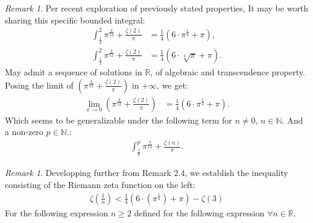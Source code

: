 \documentclass[10pt]{article}
\theoremstyle{plain}
\theoremstyle{definition}
\theoremstyle{remark}
\newtheorem{remark}[theorem]{Remark}
\begin{document}
\begin{remark}
	Per recent exploration of previously stated properties, It may be worth sharing this specific bounded integral:
	\begin{align*}
		\int_{\frac{1}{2}}^{2} \pi^{\frac{3}{12}} + \frac{\zeta(2)}{\pi} &= \frac{1}{4} (6 \cdot \pi^{\frac{1}{4}} + \pi),\\
		\int_{\frac{1}{2}}^{2} \pi^{\frac{3}{12}} + \frac{\zeta(2)}{\pi} &= \frac{1}{4} (6 \cdot \sqrt[4]{\pi} + \pi).
	\end{align*}
	May admit a sequence of solutions in $\mathbb{R}$, of algebraic and transcendence property. Posing the limit of $(\pi^{\frac{3}{12}} + \frac{\zeta(2)}{\pi})$ in $+\infty$, we get:
	\begin{align*}
	\lim_{x \to 0} (\pi^{\frac{3}{12}} + \frac{\zeta(2)}{\pi}) &= \frac{1}{4} (6 \cdot \pi^{\frac{1}{4}} + \pi).
	\end{align*}
	Which seems to be generalizable under the following term for $n \neq 0, \, n \in \mathbb{N}.$ And a non-zero $p \in \mathbb{N}.$:
	\begin{align*}
		\int_{\frac{1}{p}}^{p} \pi^{\frac{3}{12}} + \frac{\zeta(n)}{\pi}.
	\end{align*}
\end{remark}

\begin{remark}
	Developping further from Remark 2.4, we establish the inequality consisting of the Riemann zeta function on the left:
	\begin{align*}
		\zeta(\frac{1}{n}) < \frac{1}{4}(6 \cdot (\pi^{\frac{1}{4}}) + \pi) - \zeta(3)
	\end{align*}
	For the following expression $n \geq 2$ defined for the following expression $\forall n \in \mathbb{R}$.
\end{remark}
\end{document}
